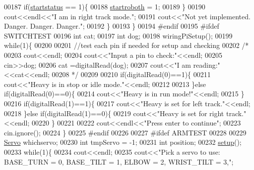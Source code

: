 \begin{DoxyCode}
00187         \textcolor{keywordflow}{if}(\hyperlink{main_8cpp_a86ef28eff7b2064f6e9f34bb8371d523}{startstatus} == 1)\{
00188             \hyperlink{main_8cpp_ad9b6ac21900fa682d910b2c72a6d1a7f}{startroboth} = 1;
00189         \}
00190         cout<<endl<<\textcolor{stringliteral}{"I am in right track mode."};
00191         cout<<\textcolor{stringliteral}{"Not yet implemented. Danger. Danger. Danger."};
00192     \}
00193 \}
00194 \textcolor{preprocessor}{#endif}
00195 \textcolor{preprocessor}{#ifdef SWITCHTEST}
00196     \textcolor{keywordtype}{int} cat;
00197     \textcolor{keywordtype}{int} dog;
00198     wiringPiSetup();
00199     \textcolor{keywordflow}{while}(1)\{
00200         
00201         \textcolor{comment}{//test each pin if needed for setup and checking}
00202         \textcolor{comment}{/*}
00203 \textcolor{comment}{        cout<<endl;}
00204 \textcolor{comment}{        cout<<"Input a pin to check:"<<endl;}
00205 \textcolor{comment}{        cin>>dog;}
00206 \textcolor{comment}{        cat =digitalRead(dog);}
00207 \textcolor{comment}{        cout<<"I am reading:"<<cat<<endl;}
00208 \textcolor{comment}{        */}
00209         
00210         \textcolor{keywordflow}{if}(digitalRead(0)==1)\{
00211             cout<<\textcolor{stringliteral}{"Heavy is in stop or idle mode."}<<endl;
00212            
00213         \}\textcolor{keywordflow}{else} \textcolor{keywordflow}{if}(digitalRead(0)==0)\{
00214             cout<<\textcolor{stringliteral}{"Heavy is in run mode!"}<<endl;
00215         \}
00216         \textcolor{keywordflow}{if}(digitalRead(1)==1)\{
00217             cout<<\textcolor{stringliteral}{"Heavy is set for left track."}<<endl;
00218         \}\textcolor{keywordflow}{else} \textcolor{keywordflow}{if}(digitalRead(1)==0)\{
00219             cout<<\textcolor{stringliteral}{"Heavy is set for right track."}<<endl;
00220         \}
00221         
00222         cout<<endl<<\textcolor{stringliteral}{"Press enter to continue"};
00223         cin.ignore();
00224     \}
00225 \textcolor{preprocessor}{#endif}
00226     
00227 \textcolor{preprocessor}{#ifdef ARMTEST}
00228     
00229     \hyperlink{Servo__Position__Shell_8h_af629c4ae98db77091b130c7fbc31cab2}{Servo} whichservo;
00230     \textcolor{keywordtype}{int} tmpServo = -1;
00231     \textcolor{keywordtype}{int} position;
00232     \hyperlink{Servo__Position__Shell_8cpp_a4fc01d736fe50cf5b977f755b675f11d}{setup}();
00233     \textcolor{keywordflow}{while}(1)\{
00234         cout<<endl;
00235         cout<<\textcolor{stringliteral}{"Pick a servo to use: BASE\_TURN = 0, BASE\_TILT = 1, ELBOW = 2, WRIST\_TILT = 3,"};

\end{DoxyCode}
